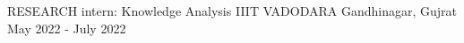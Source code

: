 \begin{cventries}
 
  \cventry
    {RESEARCH intern: Knowledge Analysis}
    {IIIT VADODARA}
    {Gandhinagar, Gujrat}
    {May 2022 - July 2022}
    {
    }
    
 \vspace{-6mm}
\end{cventries}
